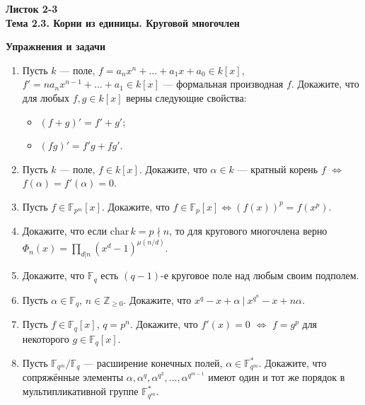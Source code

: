 \documentclass[a4paper, 11pt]{article}
\begin{document}
\begin{center} \Large \bf Листок 2-3\\ Тема 2.3. Корни из единицы. Круговой многочлен \end{center}

\noindent\textbf{Упражнения и задачи}
\begin{enumerate}[topsep=0pt]
    \item Пусть $k$ --- поле, $f=a_nx^n+\dots+a_1x+a_0 \in k[x]$, $f'=n a_n x^{n-1}+\dots+a_1 \in k[x]$ --- формальная производная $f$. Докажите, что для любых $f, g \in k[x]$ верны следующие свойства:
    \begin{itemize}[topsep=0pt]
        \item $(f+g)'=f'+g'$;
        \item $(fg)'=f'g+fg'$.
    \end{itemize}

    \item Пусть $k$ --- поле, $f \in k[x]$. Докажите, что $\alpha \in k$ --- кратный корень $f$ $\Leftrightarrow$ $f(\alpha) = f'(\alpha) = 0$.

    \item Пусть $f \in \mathbb{F}_{p^m}[x]$. Докажите, что $f\in \mathbb{F}_{p}[x] \Leftrightarrow (f(x))^p=f(x^p)$.

    \item Докажите, что если $\mathrm{char}\, k = p \nmid n$, то для кругового многочлена верно\\ $\Phi_n(x) = \prod\limits_{d|n}(x^d-1)^{\mu(n/d)}$.
    
    \item Докажите, что $\mathbb{F}_q$ есть $(q-1)$-е круговое поле над любым своим подполем. %

    \item Пусть $\alpha \in \mathbb{F}_q$, $n \in \mathbb{Z}_{\geqslant 0}$. Докажите, что $x^q-x+\alpha\ |\ x^{q^n}-x+n\alpha$. %

    \item Пусть $f \in \mathbb{F}_q[x]$, $q=p^n$. Докажите, что $f'(x)=0$ $\Leftrightarrow$ $f=g^p$ для некоторого $g \in \mathbb{F}_q[x]$. %

    \item Пусть $\mathbb{F}_{q^m}/\mathbb{F}_q$ --- расширение конечных полей, $\alpha \in \mathbb{F}_{q^m}^*$. Докажите, что сопряжённые элементы $\alpha, \alpha^q, \alpha^{q^2}, \dots, \alpha^{q^{m-1}}$ имеют один и тот же порядок в мультипликативной группе $\mathbb{F}_{q^m}^*$.   %


\end{enumerate}
\end{document}
